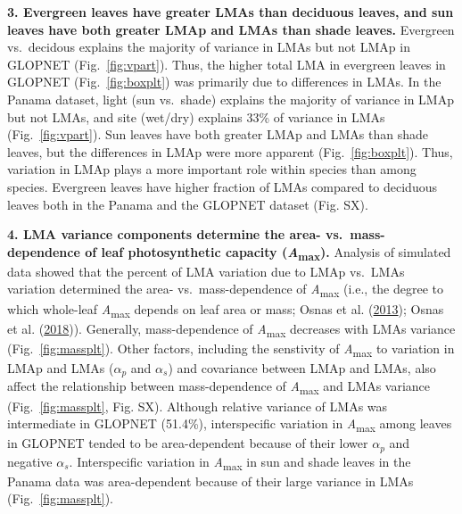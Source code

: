 \documentclass[
  12pt,
  a4paper,
,tablecaptionabove
]{scrartcl}
\begin{document}
\textbf{3. Evergreen leaves have greater LMAs than deciduous leaves, and sun leaves have both greater LMAp and LMAs than shade leaves.}
Evergreen vs.~decidous explains the majority of variance in LMAs but not LMAp in GLOPNET (Fig.~\ref{fig:vpart}).
Thus, the higher total LMA in evergreen leaves in GLOPNET (Fig.~\ref{fig:boxplt}) was primarily due to differences in LMAs.
In the Panama dataset, light (sun vs.~shade) explains the majority of variance in LMAp but not LMAs, and site (wet/dry) explains 33\% of variance in LMAs (Fig.~\ref{fig:vpart}).
Sun leaves have both greater LMAp and LMAs than shade leaves, but the differences in LMAp were more apparent (Fig.~\ref{fig:boxplt}).
Thus, variation in LMAp plays a more important role within species than among species.
Evergreen leaves have higher fraction of LMAs compared to deciduous leaves both in the Panama and the GLOPNET dataset (Fig. SX).

\textbf{4. LMA variance components determine the area- vs.~mass-dependence of leaf photosynthetic capacity (\emph{A}\textsubscript{max}).}
Analysis of simulated data showed that the percent of LMA variation due to LMAp vs.~LMAs variation determined the area- vs.~mass-dependence of \emph{A}\textsubscript{max} (i.e., the degree to which whole-leaf \emph{A}\textsubscript{max} depends on leaf area or mass; Osnas et al. (\protect\hyperlink{ref-Osnas2013}{2013}); Osnas et al. (\protect\hyperlink{ref-Osnas2018}{2018})).
Generally, mass-dependence of \emph{A}\textsubscript{max} decreases with LMAs variance (Fig.~\ref{fig:massplt}).
Other factors, including the senstivity of \emph{A}\textsubscript{max} to variation in LMAp and LMAs (\(\alpha_p\) and \(\alpha_s\)) and covariance between LMAp and LMAs, also affect the relationship between mass-dependence of \emph{A}\textsubscript{max} and LMAs variance (Fig.~\ref{fig:massplt}, Fig. SX).
Although relative variance of LMAs was intermediate in GLOPNET (51.4\%), interspecific variation in \emph{A}\textsubscript{max} among leaves in GLOPNET tended to be area-dependent because of their lower \(\alpha_p\) and negative \(\alpha_s\).
Interspecific variation in \emph{A}\textsubscript{max} in sun and shade leaves in the Panama data was area-dependent because of their large variance in LMAs (Fig.~\ref{fig:massplt}).
\end{document}
